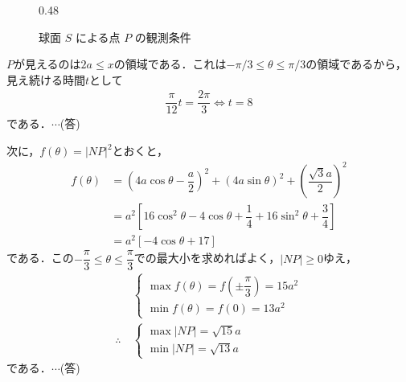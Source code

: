 \documentclass[../../main.tex]{subfiles}
\begin{document}
\begin{figure}[htb]
\begin{subcaptionblock}{0.48\textwidth}
    \caption{$xy$ 平面における可視領域（太線部）}
  \end{subcaptionblock}
  \caption{球面 $S$ による点 $P$ の観測条件}
  \label{fig:sphere_visibility}
\end{figure}

$P$が見えるのは$2a\le x$の領域である．これは$-\pi/3\le\theta\le\pi/3$の領域であるから，見え続ける時間$t$として
\begin{align}
  \dfrac{\pi}{12}t=\dfrac{2\pi}{3} \Longleftrightarrow t=8
\end{align}
である．$\cdots$(答)

次に，$f(\theta)=|NP|^2$とおくと，
\begin{align}
  f(\theta)&=\left(4a\cos\theta-\dfrac{a}{2}\right)^2+(4a\sin\theta)^2+\left(\dfrac{\sqrt{3}a}{2}\right)^2 \\
  &=a^2\left[16\cos^2\theta-4\cos\theta+\dfrac{1}{4}+16\sin^2\theta+\dfrac{3}{4}\right] \\
  &=a^2\left[-4\cos\theta+17\right]
\end{align}
である．この$-\dfrac{\pi}{3}\le\theta\le\dfrac{\pi}{3}$での最大小を求めればよく，$|NP|\ge0$ゆえ，
\begin{align}
  &
  \begin{cases}
    \max f(\theta)=f\left(\pm\dfrac{\pi}{3}\right)=15a^2 \\
    \min f(\theta)=f(0)=13a^2
  \end{cases} \\
  \therefore \
  &
  \begin{cases}
    \max |NP|=\sqrt{15}a \\
    \min |NP|=\sqrt{13}a
  \end{cases}
\end{align}
である．$\cdots$(答)

\newpage
\end{document}

